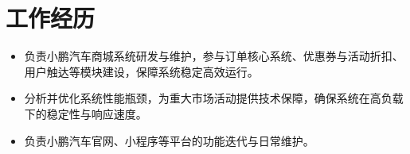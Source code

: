 \section{工作经历}
\begin{itemize}
  \item 负责小鹏汽车商城系统研发与维护，参与订单核心系统、优惠券与活动折扣、用户触达等模块建设，保障系统稳定高效运行。
  \item 分析并优化系统性能瓶颈，为重大市场活动提供技术保障，确保系统在高负载下的稳定性与响应速度。
  \item 负责小鹏汽车官网、小程序等平台的功能迭代与日常维护。
\end{itemize}
